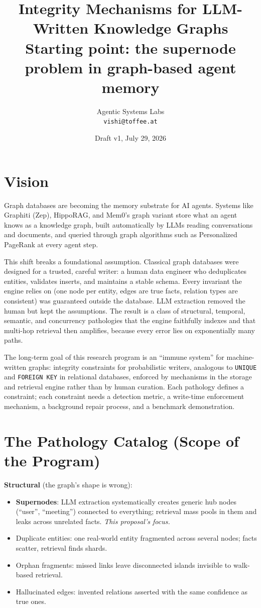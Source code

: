 \documentclass[11pt,a4paper]{article}
\title{Integrity Mechanisms for LLM-Written Knowledge Graphs\\
\large Starting point: the supernode problem in graph-based agent memory}
\author{Agentic Systems Labs\\
\texttt{vishi@toffee.at}}
\date{Draft v1, July 29, 2026}
\newcommand{\code}[1]{\texttt{#1}}
\begin{document}
\maketitle

\section{Vision}

Graph databases are becoming the memory substrate for AI agents. Systems like Graphiti (Zep), HippoRAG, and Mem0's graph variant store what an agent knows as a knowledge graph, built automatically by LLMs reading conversations and documents, and queried through graph algorithms such as Personalized PageRank at every agent step.

This shift breaks a foundational assumption. Classical graph databases were designed for a trusted, careful writer: a human data engineer who deduplicates entities, validates inserts, and maintains a stable schema. Every invariant the engine relies on (one node per entity, edges are true facts, relation types are consistent) was guaranteed outside the database. LLM extraction removed the human but kept the assumptions. The result is a class of structural, temporal, semantic, and concurrency pathologies that the engine faithfully indexes and that multi-hop retrieval then amplifies, because every error lies on exponentially many paths.

The long-term goal of this research program is an ``immune system'' for machine-written graphs: integrity constraints for probabilistic writers, analogous to \code{UNIQUE} and \code{FOREIGN KEY} in relational databases, enforced by mechanisms in the storage and retrieval engine rather than by human curation. Each pathology defines a constraint; each constraint needs a detection metric, a write-time enforcement mechanism, a background repair process, and a benchmark demonstration.

\section{The Pathology Catalog (Scope of the Program)}

\textbf{Structural} (the graph's shape is wrong):
\begin{itemize}[nosep]
  \item \textbf{Supernodes}: LLM extraction systematically creates generic hub nodes (``user'', ``meeting'') connected to everything; retrieval mass pools in them and leaks across unrelated facts. \emph{This proposal's focus.}
  \item Duplicate entities: one real-world entity fragmented across several nodes; facts scatter, retrieval finds shards.
  \item Orphan fragments: missed links leave disconnected islands invisible to walk-based retrieval.
  \item Hallucinated edges: invented relations asserted with the same confidence as true ones.
\end{itemize}
\end{document}
